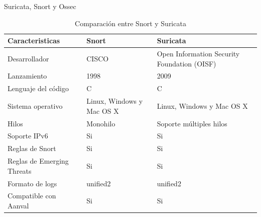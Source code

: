 \begin{subsection}{Suricata, Snort y Ossec}
\begin{table}[H]
\begin{tabular}{|m{10em}|m{11em}|m{11em}|}
            \hline 
                Caracteristicas  & Snort &  Suricata \\ 
            \hline
                Desarrollador & CISCO & Open Information Security Foundation (OISF)  \\ 
            \hline
                Lanzamiento  & 1998 & 2009 \\ 
            \hline
                Lenguaje del código & C  & C  \\
            \hline
                Sistema operativo & Linux, Windows y Mac OS X  & Linux, Windows y Mac OS X  \\
            \hline
                Hilos & Monohilo  & Soporte múltiples hilos  \\
            \hline
                Soporte IPv6 & Si  & Si  \\
            \hline
                Reglas de Snort & Si  & Si \\
            \hline
                Reglas de Emerging Threats & Si  & Si \\
            \hline
                Formato de logs & unified2  & unified2   \\
            \hline
                Compatible con Aanval & Si  & Si   \\
            \hline %
        \end{tabular}
        \caption{Comparación entre Snort y Suricata}
        \label{table:4}
    \end{table}
        
   \end{subsection}